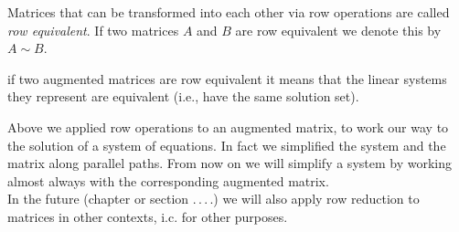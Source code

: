 \begin{dfn}
\label{Ex:LinSystems:RowEquivalent}
Matrices that can be transformed into each other via row operations are called \emph{row equivalent}.
If two matrices $A$ and $B$ are row equivalent we denote this by  $A \sim B$.
\end{dfn}


\begin{rem}
if two augmented matrices are row equivalent it means that the linear systems they represent are equivalent (i.e., have the same solution set).
\end{rem}

Above we applied row operations to an augmented matrix, to work our way to the solution of a system of equations.
In fact we simplified the system and the matrix along parallel paths.  From now on we will simplify a system by working almost always with the corresponding augmented matrix. \\
In the future (chapter or section .\,.\,.\,.) we will also apply row reduction to matrices in other contexts, i.c. for other purposes.


